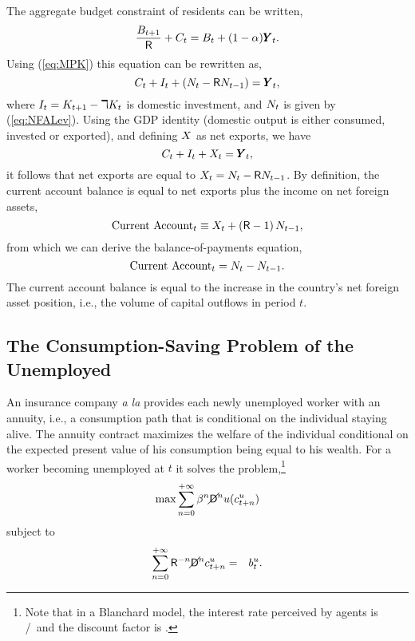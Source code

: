 \documentclass[titlepage,abstract,letterpaper]{econtex}
\renewcommand{\GDPLev}{\ensuremath{\pmb{Y}}}
\begin{document}
The aggregate budget constraint of residents can be written,
\begin{equation*}
\frac{\BLev_{t+1}}{\Rfree}+\CLev_t=\BLev_t+(1-\kapShare)\GDPLev_t.
\end{equation*}
Using (\ref{eq:MPK}) this equation can be rewritten as,
\begin{equation*}
\CLev_t+\ILev_t+\left(\NFALev_t-\Rfree \NFALev_{t-1} \right)=\GDPLev_t,
\end{equation*}
where $I_t=K_{t+1}- \daleth K_t$ is domestic investment, and $N_t$ is given by (\ref{eq:NFALev}). Using the GDP identity (domestic output is either consumed, invested or exported),
and defining $X$ as net exports, we have
\begin{equation*}
\CLev_t+\ILev_t+\XLev_t=\GDPLev_t,
\end{equation*}
it follows that net exports are equal to $X_t=N_t-\mathsf{R} N_{t-1}$. By definition, the current account balance is equal to net exports plus the income on net foreign assets,
\begin{equation*}
\text{Current Account}_t \equiv X_t+\left(\mathsf{R}-1 \right) N_{t-1},
\end{equation*}
from which we can derive the balance-of-payments equation,
\begin{equation*}
\text{Current Account}_t=N_t -N_{t-1}.
\end{equation*}
The current account balance is equal to the increase in the country's net foreign asset position, i.e., the volume of capital outflows in period $t$.

\subsection{The Consumption-Saving Problem of the Unemployed}

An insurance company {\it a la} \cite{blanchardFinite} provides each
newly unemployed worker with an annuity, i.e., a consumption path that
is conditional on the individual staying alive. The annuity contract
maximizes the welfare of the individual conditional on the expected
present value of his consumption being equal to his wealth. For a
worker becoming unemployed at $t$ it solves the problem,\footnote{Note that in a Blanchard model, the interest rate perceived by agents is \Rfree/\PLives~and the discount factor is \Discount \PLives.}
\begin{equation*}
 \max \sum_{n=0}^{+ \infty} \beta^{n} \cancel{\mathsf{D}}^{n} u(c^u_{t+n})
\end{equation*}
subject to
\begin{eqnarray*}
\sum_{n=0}^{+ \infty} \mathsf{R}^{-n} \cancel{\mathsf{D}}^{n} c^u_{t+n} & = &b^{u}_t.
\end{eqnarray*}
\end{document}
